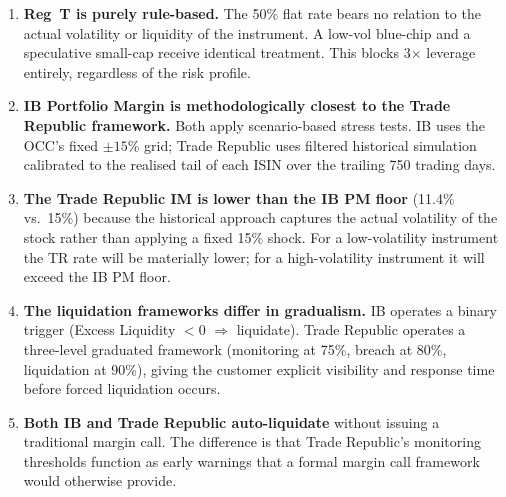\documentclass[9pt, a4paper]{extarticle}
\begin{document}
\begin{enumerate}[leftmargin=2em]

\item \textbf{Reg~T is purely rule-based.} The 50\% flat rate bears no relation to the
      actual volatility or liquidity of the instrument. A low-vol blue-chip and a
      speculative small-cap receive identical treatment. This blocks 3$\times$ leverage
      entirely, regardless of the risk profile.

\item \textbf{IB Portfolio Margin is methodologically closest to the Trade Republic
      framework.} Both apply scenario-based stress tests. IB uses the OCC's fixed
      $\pm 15\%$ grid; Trade Republic uses filtered historical simulation calibrated
      to the realised tail of each ISIN over the trailing 750 trading days.

\item \textbf{The Trade Republic IM is lower than the IB PM floor} (11.4\% vs.\ 15\%)
      because the historical approach captures the actual volatility of the stock rather
      than applying a fixed 15\% shock. For a low-volatility instrument the TR rate will
      be materially lower; for a high-volatility instrument it will exceed the IB PM
      floor.

\item \textbf{The liquidation frameworks differ in gradualism.} IB operates a binary
      trigger (Excess Liquidity $< 0$ $\Rightarrow$ liquidate). Trade Republic operates
      a three-level graduated framework (monitoring at 75\%, breach at 80\%, liquidation
      at 90\%), giving the customer explicit visibility and response time before forced
      liquidation occurs.

\item \textbf{Both IB and Trade Republic auto-liquidate} without issuing a traditional
      margin call. The difference is that Trade Republic's monitoring thresholds
      function as early warnings that a formal margin call framework would otherwise provide.

\end{enumerate}
\end{document}
